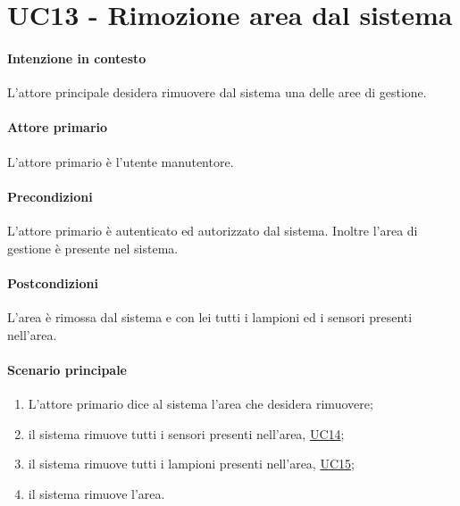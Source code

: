 \section{UC13 - Rimozione area dal sistema}\label{uc:13}

\paragraph{Intenzione in contesto} L'attore principale desidera rimuovere dal sistema una delle aree di gestione.

\paragraph{Attore primario} L'attore primario è l'utente manutentore.

\paragraph{Precondizioni} L'attore primario è autenticato ed autorizzato dal sistema. Inoltre l'area di gestione è presente nel sistema.

\paragraph{Postcondizioni} L'area è rimossa dal sistema e con lei tutti i lampioni ed i sensori presenti nell'area.

\paragraph{Scenario principale} 
\begin{enumerate}
    \item L'attore primario dice al sistema l'area che desidera rimuovere;
    \item il sistema rimuove tutti i sensori presenti nell'area, \hyperref[uc:14]{UC14};
    \item il sistema rimuove tutti i lampioni presenti nell'area, \hyperref[uc:15]{UC15};
    \item il sistema rimuove l'area.
\end{enumerate}